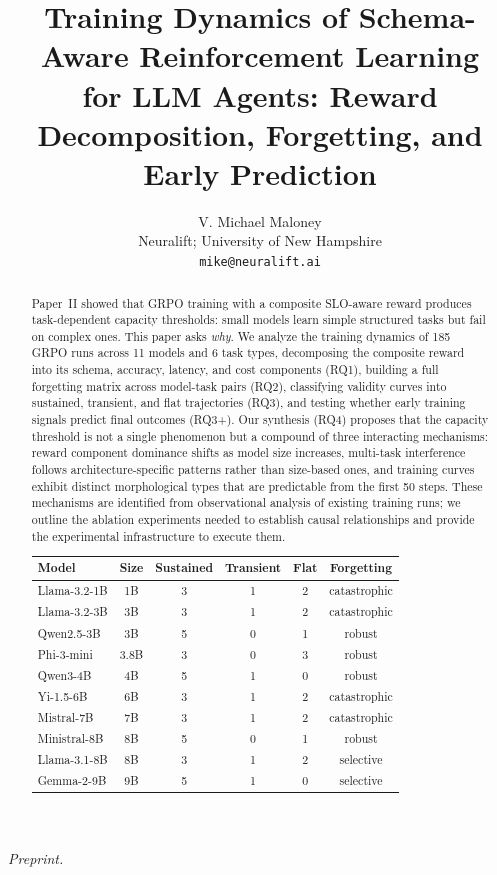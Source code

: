 \documentclass[11pt]{article}
\title{Training Dynamics of Schema-Aware Reinforcement Learning\\for LLM Agents: Reward Decomposition, Forgetting, and\\Early Prediction}
\author{
V. Michael Maloney \\
Neuralift; University of New Hampshire \\
\texttt{mike@neuralift.ai}
}
\date{}
\begin{document}
\maketitle
\begin{center}
\textit{Preprint.}
\end{center}

\begin{abstract}
Paper~II showed that GRPO training with a composite SLO-aware reward produces task-dependent capacity thresholds: small models learn simple structured tasks but fail on complex ones.  This paper asks \emph{why}.  We analyze the training dynamics of 185 GRPO runs across 11 models and 6 task types, decomposing the composite reward into its schema, accuracy, latency, and cost components (RQ1), building a full forgetting matrix across model-task pairs (RQ2), classifying validity curves into sustained, transient, and flat trajectories (RQ3), and testing whether early training signals predict final outcomes (RQ3+).  Our synthesis (RQ4) proposes that the capacity threshold is not a single phenomenon but a compound of three interacting mechanisms: reward component dominance shifts as model size increases, multi-task interference follows architecture-specific patterns rather than size-based ones, and training curves exhibit distinct morphological types that are predictable from the first 50 steps.  These mechanisms are identified from observational analysis of existing training runs; we outline the ablation experiments needed to establish causal relationships and provide the experimental infrastructure to execute them.

\begin{center}
\small
\begin{tabular}{lc ccc c}
\toprule
\textbf{Model} & \textbf{Size} & \textbf{Sustained} & \textbf{Transient} & \textbf{Flat} & \textbf{Forgetting} \\
\midrule
Llama-3.2-1B    & 1B   & 3 & 1 & 2 & catastrophic \\
Llama-3.2-3B    & 3B   & 3 & 1 & 2 & catastrophic \\
Qwen2.5-3B      & 3B   & 5 & 0 & 1 & robust \\
Phi-3-mini       & 3.8B & 3 & 0 & 3 & robust \\
Qwen3-4B         & 4B   & 5 & 1 & 0 & robust \\
Yi-1.5-6B        & 6B   & 3 & 1 & 2 & catastrophic \\
Mistral-7B       & 7B   & 3 & 1 & 2 & catastrophic \\
Ministral-8B     & 8B   & 5 & 0 & 1 & robust \\
Llama-3.1-8B     & 8B   & 3 & 1 & 2 & selective \\
Gemma-2-9B       & 9B   & 5 & 1 & 0 & selective \\
\bottomrule
\end{tabular}
\end{center}


\end{abstract}
\end{document}
